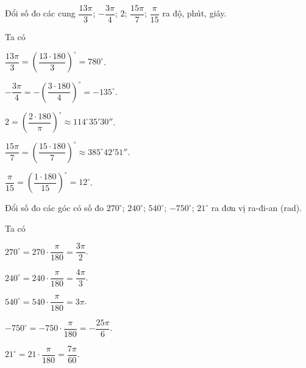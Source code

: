 \begin{bt}%

	Đổi số đo các cung $\dfrac{13\pi}{3}$; $-\dfrac{3\pi}{4}$; $2$; $\dfrac{15\pi}{7}$; $\dfrac{\pi}{15}$ ra độ, phút, giây.
	\loigiai
	{
		Ta có
		\begin{listEX}[3]
			\item $\dfrac{13\pi}{3} = \left(\dfrac{13\cdot 180}{3}\right)^\circ = 780^\circ$.
			\item $-\dfrac{3\pi}{4} = -\left(\dfrac{3\cdot 180}{4}\right)^\circ = -135^\circ$.
			\item $2 = \left(\dfrac{2\cdot 180}{\pi}\right)^\circ \approx 114^\circ 	35' 30''$.
			\item $\dfrac{15\pi}{7} = \left(\dfrac{15\cdot 180}{7}\right)^\circ \approx 385^\circ 42'51''$.
			\item $\dfrac{\pi}{15} = \left(\dfrac{1\cdot 180}{15}\right)^\circ = 12^\circ$.
		\end{listEX}
	}
\end{bt}

\begin{bt}%

	Đổi số đo các góc có số đo $270^\circ$; $240^\circ$; $540^\circ$; $-750^\circ$; $21^\circ$ ra đơn vị ra-đi-an (rad).
	\loigiai
	{
		Ta có
		\begin{listEX}[3]
			\item $270^\circ = 270\cdot \dfrac{\pi}{180} = \dfrac{3\pi}{2}$.
			\item $240^\circ = 240\cdot \dfrac{\pi}{180} = \dfrac{4\pi}{3}$.
			\item $540^\circ = 540\cdot \dfrac{\pi}{180} = 3\pi$.
			\item $-750^\circ = -750\cdot \dfrac{\pi}{180} = -\dfrac{25\pi}{6}$.
			\item $21^\circ = 21\cdot \dfrac{\pi}{180} = \dfrac{7\pi}{60}$.
		\end{listEX}
	}
\end{bt}

